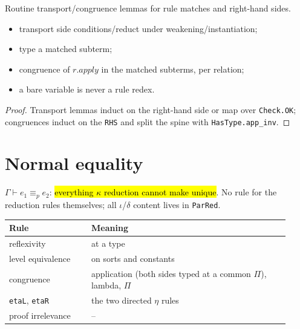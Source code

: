 \begin{lemma}
\label{fam:cr-pattern-plumbing}
\leanok
{}

 Routine transport/congruence lemmas for rule matches and right-hand sides.
\begin{itemize}
\item transport side conditions/reduct under weakening/instantiation;
\item type a matched subterm;
\item congruence of $r.apply$ in the matched subterms, per relation;
\item a bare variable is never a rule redex.
\end{itemize}
\end{lemma}
\begin{proof}
\leanok
{} Transport lemmas induct on the right-hand side or map over \texttt{Check.OK};
congruences induct on the \texttt{RHS} and split the spine with \texttt{HasType.app\_inv}.
\end{proof}

\section{Normal equality}

\begin{definition}
\label{def:normaleq}
\leanok
{}

 $\Gamma\vdash e_1\equiv_p e_2$: \hl{everything $\kappa$ reduction cannot make
unique}. No rule for the reduction rules themselves; all $\iota$/$\delta$ content lives in
\texttt{ParRed}.
\par\smallskip\noindent
\begin{tabular}{p{0.27\linewidth}p{0.65\linewidth}}
\toprule
Rule & Meaning \\
\midrule
reflexivity & at a type \\
level equivalence & on sorts and constants \\
congruence & application (both sides typed at a common $\Pi$), lambda, $\Pi$ \\
\texttt{etaL}, \texttt{etaR} & the two directed $\eta$ rules \\
proof irrelevance & -- \\
\bottomrule
\end{tabular}\par\smallskip
\end{definition}

